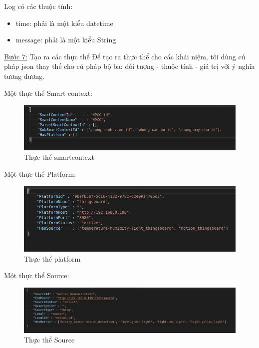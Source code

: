 \hspace{0mm}Log có các thuộc tính:
\begin{itemize}
	\item time: phải là một kiểu datetime
	\item message: phải là một kiểu String
\end{itemize}


\underline{Bước 7:} Tạo ra các thực thể
Để tạo ra thực thể cho các khái niệm, tôi dùng cú pháp json thay thế cho cú pháp bộ ba: đối tượng - thuộc tính - giá trị với ý nghĩa tương đương.

\hspace{0mm}Một thực thể Smart context: \\
\clearpage
\begin{figure}[h!]
	\center
	\includegraphics[scale=0.5]{image/smartcontext_instance}
	\caption{Thực thể smartcontext}
\end{figure}

\hspace{0mm}Một thực thể Platform: \\
\begin{figure}[h!]
	\center
	\includegraphics[scale=0.5]{image/platform_instance}
	\caption{Thực thể platform}
\end{figure}

\hspace{0mm}Một thực thể Source:
\begin{figure}[h!]
	\center
	\includegraphics[scale=0.4]{image/source_instance}
	\caption{Thực thể Source}
\end{figure}


